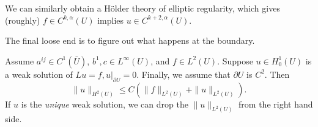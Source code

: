 \documentclass[a4paper]{article}
\begin{document}
We can similarly obtain a H\"older theory of elliptic regularity, which gives (roughly) $f \in C^{k, \alpha}(U)$ implies $u \in C^{k + 2, \alpha}(U)$.

The final loose end is to figure out what happens at the boundary.

\begin{thm}
  Assume $a^{ij} \in C^1(\bar{U})$, $b^1, c \in L^\infty(U)$, and $f \in L^2(U)$. Suppose $u \in H_0^1(U)$ is a weak solution of $Lu = f, u|_{\partial U} = 0$. Finally, we assume that $\partial U$ is $C^2$. Then
  \[
    \|u\|_{H^2(U)} \leq C (\|f\|_{L^2(U)} + \|u\|_{L^2(U)}).
  \]
  If $u$ is the \emph{unique} weak solution, we can drop the $\|u\|_{L^2(U)}$ from the right hand side.
\end{thm}
\end{document}
